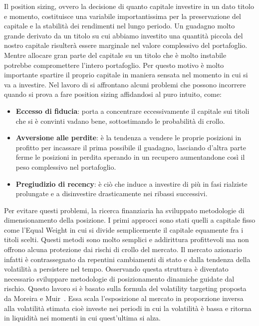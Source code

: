 
Il position sizing, ovvero la decisione di quanto capitale investire in un dato titolo e momento, costituisce 
una variabile importantissima per la preservazione del capitale e la stabilità dei rendimenti nel lungo periodo.
Un guadagno molto grande derivato da un titolo su cui abbiamo investito una quantità piccola del nostro capitale risulterà essere marginale nel valore complessivo del portafoglio.
Mentre allocare gran parte del capitale su un titolo che è molto instabile potrebbe compromettere l'intero portafoglio.
Per questo motivo è molto importante spartire il proprio capitale in maniera sensata nel momento in cui si va a investire.
Nel lavoro di \citet{blotnick2025power} si affrontano alcuni problemi che possono incorrere quando si prova a fare position sizing affidandosi al puro intuito, come:
\begin{itemize}
    \item \textbf{Eccesso di fiducia}: porta a concentrare eccessivamente il capitale sui titoli che si è convinti vadano bene, sottostimando le probabilità di crollo.
    \item \textbf{Avversione alle perdite}: è la tendenza a vendere le proprie posizioni in profitto per incassare il prima possibile il guadagno, lasciando d'altra parte ferme le posizioni in perdita sperando in un recupero aumentandone così il peso complessivo nel portafoglio.
    \item \textbf{Pregiudizio di recency}: è ciò che induce a investire di più in fasi rialziste prolungate e a disinvestire drasticamente nei ribassi successivi.
\end{itemize}

Per evitare questi problemi, la ricerca finanziaria ha sviluppato metodologie di dimensionamento della posizione.
I primi approcci sono stati quelli a capitale fisso come l'Equal Weight in cui si divide semplicemente il capitale equamente fra i titoli scelti.
Questi metodi sono molto semplici e addirittura profittevoli ma non offrono alcuna protezione dai rischi di crollo del mercato.
Il mercato azionario infatti è contrassegnato da repentini cambiamenti di stato e dalla tendenza della volatilità a persistere nel tempo.
Osservando questa struttura è diventato necessario sviluppare metodologie di posizionamento dinamiche guidate dal rischio.
Questo lavoro si è basato sulla formula del volatility targeting proposta da Moreira e Muir~\cite{moreira2017volatility}. Essa scala l'esposizione al mercato in proporzione inversa alla volatilità stimata
cioè investe nei periodi in cui la volatilità è bassa e ritorna in liquidità nei momenti in cui quest'ultima si alza.

